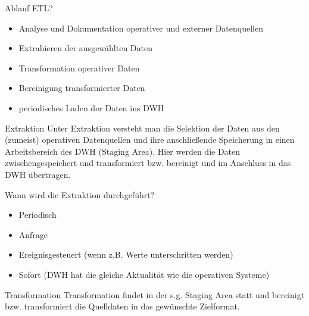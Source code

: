 \documentclass[a6paper,10pt,grid=front%
,toc
]{kartei}
\begin{document}
  \begin{karte}{Ablauf ETL?}
    \begin{itemize}
      \item Analyse und Dokumentation operativer und externer Datenquellen
      \item Extrahieren der ausgewählten Daten
      \item Transformation operativer Daten
      \item Bereinigung transformierter Daten
      \item periodisches Laden der Daten ins DWH
    \end{itemize}
  \end{karte}

  \begin{karte}{Extraktion}
    Unter Extraktion versteht man die Selektion der Daten aus den (zumeist) operativen Datenquellen und ihre anschließende Speicherung in einen Arbeitsbereich des DWH (Staging Area). Hier werden die Daten zwischengespeichert und transformiert bzw. bereinigt und im Anschluss in das DWH übertragen.
  \end{karte}

  \begin{karte}{Wann wird die Extraktion durchgeführt?}
      \begin{itemize} 
      \item Periodisch
      \item Anfrage
      \item Ereignisgesteuert (wenn z.B. Werte unterschritten werden)
      \item Sofort (DWH hat die gleiche Aktualität wie die operativen Systeme)
    \end{itemize}
  \end{karte}

  \begin{karte}{Transformation}
      Transformation findet in der s.g. Staging Area statt und bereinigt bzw. transformiert die Quelldaten in das gewünschte Zielformat.
  \end{karte}
\end{document}
